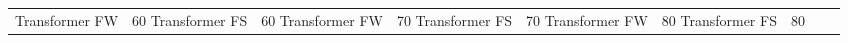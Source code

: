 \begin{table}
\begin{tabular}{|l|c|c|c|c|c|c|c|c|}
Transformer FW & 60%
Transformer FS & 60%
Transformer FW & 70%
Transformer FS & 70%
Transformer FW & 80%
Transformer FS & 80%
\bottomrule
\end{tabular}
\end{table}

